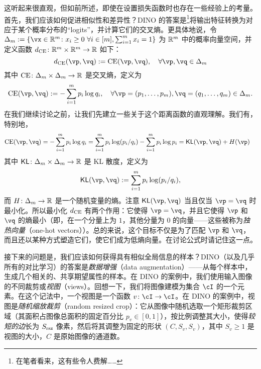 \documentclass[../../book-main.tex]{subfiles}
\begin{document}
这听起来很直观，但如前所述，即使在设置损失函数时也存在一些经验上的考量。首先，我们应该如何促进相似性和差异性？DINO \citep{caron2021emerging} 的答案是\footnote{在笔者看来，这有些令人费解……}将输出特征转换为对应于某个概率分布的“logits”，并计算它们的交叉熵。更具体地说，令 \(\Delta_{m} := \{\vx \in \R^{m} \colon x_{i} \geq 0\ \forall i \in [m], \sum_{i = 1}^{m}x_{i} = 1\}\) 为 \(\mathbb{R}^{m}\) 中的概率向量空间，并定义函数 \(d_{\operatorname{CE}} \colon \mathbb{R}^{m} \times \mathbb{R}^{m} \to \mathbb{R}\) 如下：
 \begin{equation}\label{eq:cross_entropy_difference}
    d_{\CE}(\vp, \vq) := \CE(\vp, \vq), \quad \forall \vp, \vq \in \Delta_{m}
 \end{equation}
 其中 \(\operatorname{CE} \colon \Delta_{m} \times \Delta_{m} \to \mathbb{R}\) 是交叉熵，定义为
 \begin{equation}\label{eq:expts_def_ce}
    \CE(\vp, \vq) := -\sum_{i = 1}^{m}p_{i}\log q_{i}, \quad \forall \vp = (p_{1}, \dots, p_{m}), \vq = (q_{1}, \dots, q_{m}) \in \Delta_{m}.
 \end{equation}
 在我们继续讨论之前，让我们先建立一些关于这个距离函数的直观理解。我们有，特别地，
 \begin{align}
    \CE(\vp, \vq)
    &= -\sum_{i = 1}^{m}p_{i}\log q_{i} = \sum_{i = 1}^{m}p_{i}\log(p_{i}/q_{i}) - \sum_{i = 1}^{m}p_{i}\log p_{i} = \KL(\vp, \vq) + H(\vp)
 \end{align}
 其中 \(\operatorname{\mathsf{KL}} \colon \Delta_{m} \times \Delta_{m} \to \mathbb{R}\) 是 KL 散度，定义为
 \begin{equation}
    \KL(\vp, \vq) := \sum_{i = 1}^{m}p_{i}\log(p_{i}/q_{i}),
 \end{equation}
 而 \(H \colon \Delta_{m} \to \mathbb{R}\) 是一个随机变量的熵。注意 \(\KL(\vp, \vq)\) 当且仅当 \(\vp = \vq\) 时最小化。所以最小化 \(d_{\operatorname{CE}}\) 有两个作用：它使得 \(\vp = \vq\)，并且它使得 \(\vp\) 和 \(\vq\) 的熵最小（即，在一个分量上为 \(1\)，其他分量为 \(0\) 的向量——这些被称为\textit{独热向量}（one-hot vectors））。总的来说，这个目标不仅是为了匹配 \(\vp\) 和 \(\vq\)，而且还以某种方式塑造它们，使它们成为低熵向量。在讨论公式时请记住这一点。

接下来的问题是，我们应该如何获得具有相似全局信息的样本？DINO（以及几乎所有的对比学习）的答案是\textit{数据增强}（data augmentation）——从每个样本中，生成几个相关的、共享期望属性的样本。在 DINO 的案例中，我们使用输入图像的不同裁剪或\textit{视图}（views）。回想一下，我们将图像建模为集合 \(\cI\) 的一个元素。在这个记法中，一个视图是一个函数 \(v \colon \cI \to \cI\)。在 DINO 的案例中，视图是\textit{随机缩放裁剪}（random resized crop）：它从图像中随机选取一个矩形裁剪区域（其面积占图像总面积的固定百分比 \(p_{v} \in [0, 1]\)），按比例调整其大小，使得\textit{较短的边}长为 \(S_{\mathrm{rsz}}\) 像素，然后将其调整为固定的形状 \((C, S_{v}, S_{v})\)，其中 \(S_{v} \geq 1\) 是视图的大小，\(C\) 是原始图像的通道数。
\end{document}
